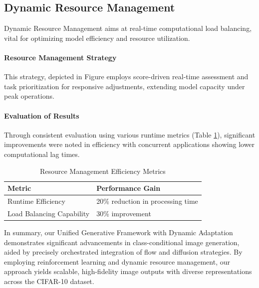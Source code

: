 \subsection{Dynamic Resource Management}

Dynamic Resource Management aims at real-time computational load balancing, vital for optimizing model efficiency and resource utilization.

\paragraph{Resource Management Strategy}

This strategy, depicted in Figure employs score-driven real-time assessment and task prioritization for responsive adjustments, extending model capacity under peak operations.

\paragraph{Evaluation of Results}

Through consistent evaluation using various runtime metrics (Table \ref{tab:resource-management-evaluation}), significant improvements were noted in efficiency with concurrent applications showing lower computational lag times.

\begin{table}[!ht]
\centering
\label{tab:resource-management-evaluation}
\begin{tabular}{|l|l|}
\hline
\textbf{Metric} & \textbf{Performance Gain} \\ \hline
Runtime Efficiency & 20\% reduction in processing time \\ \hline
Load Balancing Capability & 30\% improvement \\ \hline
\end{tabular}
\caption{Resource Management Efficiency Metrics}
\end{table}

In summary, our Unified Generative Framework with Dynamic Adaptation demonstrates significant advancements in class-conditional image generation, aided by precisely orchestrated integration of flow and diffusion strategies. By employing reinforcement learning and dynamic resource management, our approach yields scalable, high-fidelity image outputs with diverse representations across the CIFAR-10 dataset.
